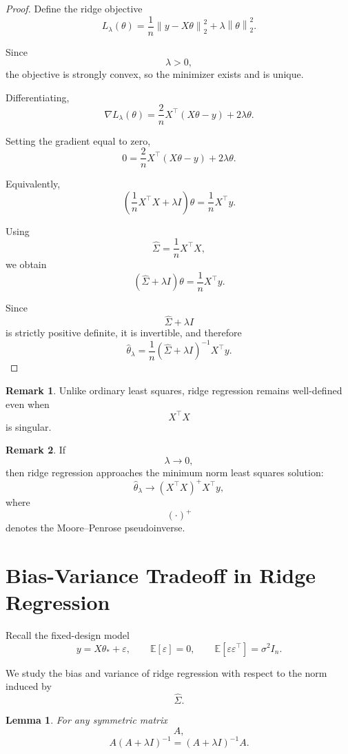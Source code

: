 \documentclass[12pt,oneside]{book}
\numberwithin{equation}{section}
\theoremstyle{definition}
\newtheorem{remark}{Remark}[section]
\theoremstyle{plain}
\newtheorem{lemma}{Lemma}[section]
\theoremstyle{remark}
\newcommand{\E}{\mathbb{E}}
\newcommand{\norm}[1]{\left\lVert #1 \right\rVert}
\begin{document}
\begin{proof}
Define the ridge objective
\[
L_\lambda(\theta)
=
\frac{1}{n}\norm{y-X\theta}_2^2
+
\lambda\norm{\theta}_2^2.
\]

Since
\[
\lambda>0,
\]
the objective is strongly convex, so the minimizer exists and is unique.

Differentiating,
\[
\nabla L_\lambda(\theta)
=
\frac{2}{n}X^\top(X\theta-y)+2\lambda\theta.
\]

Setting the gradient equal to zero,
\[
0
=
\frac{2}{n}X^\top(X\theta-y)+2\lambda\theta.
\]

Equivalently,
\[
\left(
\frac{1}{n}X^\top X+\lambda I
\right)\theta
=
\frac{1}{n}X^\top y.
\]

Using
\[
\widehat{\Sigma}
=
\frac{1}{n}X^\top X,
\]
we obtain
\[
(\widehat{\Sigma}+\lambda I)\theta
=
\frac{1}{n}X^\top y.
\]

Since
\[
\widehat{\Sigma}+\lambda I
\]
is strictly positive definite, it is invertible, and therefore
\[
\widehat{\theta}_\lambda
=
\frac{1}{n}
(\widehat{\Sigma}+\lambda I)^{-1}X^\top y.
\]
\end{proof}

\begin{remark}
Unlike ordinary least squares, ridge regression remains well-defined even when
\[
X^\top X
\]
is singular.
\end{remark}

\begin{remark}
If
\[
\lambda\to0,
\]
then ridge regression approaches the minimum norm least squares solution:
\[
\widehat{\theta}_\lambda
\to
(X^\top X)^+X^\top y,
\]
where
\[
(\cdot)^+
\]
denotes the Moore--Penrose pseudoinverse.
\end{remark}

\section{Bias-Variance Tradeoff in Ridge Regression}

Recall the fixed-design model
\[
y=X\theta_*+\varepsilon,
\qquad
\E[\varepsilon]=0,
\qquad
\E[\varepsilon\varepsilon^\top]=\sigma^2I_n.
\]

We study the bias and variance of ridge regression with respect to the norm induced by
\[
\widehat{\Sigma}.
\]

\begin{lemma}
For any symmetric matrix
\[
A,
\]
\[
A(A+\lambda I)^{-1}
=
(A+\lambda I)^{-1}A.
\]
\end{lemma}
\end{document}
